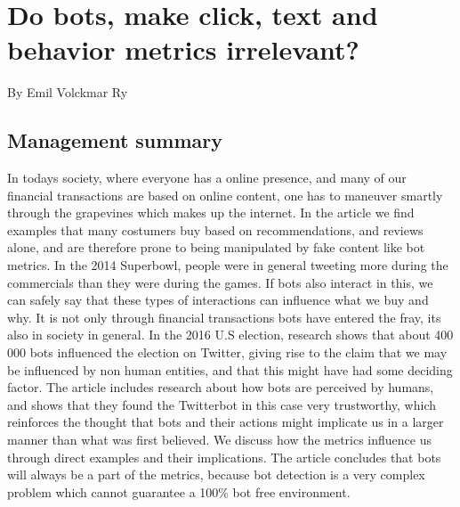 \chapter[Bot Metrics]{Do bots,  make click, text and behavior metrics irrelevant?}
\small{By Emil Volckmar Ry}
\section*{Management summary}
In todays society, where everyone has a online presence, and many of our financial transactions are based on online content, one has to maneuver smartly through the grapevines which makes up the internet. In the article we find examples that many costumers buy based on recommendations, and reviews alone, and are therefore prone to being manipulated by fake content like bot metrics. In the 2014 Superbowl, people were in general tweeting more during the commercials than they were during the games. If bots also interact in this, we can safely say that these types of interactions can influence what we buy and why. 
It is not only through financial transactions bots have entered the fray, its also in society in general. In the 2016 U.S election, research shows that about 400 000 bots influenced the election on Twitter, giving rise to the claim that we may be influenced by non human entities, and that this might have had some deciding factor. The article includes research about how bots are perceived by humans, and shows that they found the Twitterbot in this case very trustworthy, which reinforces the thought that bots and their actions might implicate us in a larger manner than what was first believed. We discuss how the metrics influence us through direct examples and their implications. The article concludes that bots will always be a part of the metrics, because bot detection is a very complex problem which cannot guarantee a 100\% bot free environment. 
